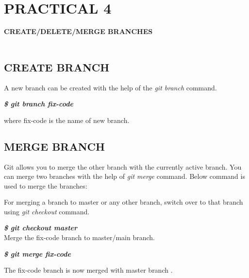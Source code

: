 \documentclass[12pt]{article}
\begin{document}
\section{PRACTICAL 4}

\textbf{\uppercase {Create/Delete/Merge Branches}} \\
\vspace{0.1\baselineskip} \\
 
\subsection{CREATE BRANCH}
A new branch can be created  with the help of the \emph{git branch} command.\\

\vspace{1 mm}

\textit{\textbf{\$ git branch fix-code}}\\

\vspace{1 mm}

where fix-code is the name of new branch.

\subsection{MERGE BRANCH}
Git allows you to merge the other branch with the currently active branch. You can merge two branches with the help of \emph{git merge} command. Below command is used to merge the branches:\\

\vspace{1 mm}

For merging a branch to master or any other branch, switch over to that branch using \emph{git checkout} command.\\
\vspace{1 mm}

\textit{\textbf{\$ git checkout master}}\\

Merge the fix-code branch to master/main branch.\\

\vspace{1 mm}

\textit{\textbf{\$ git merge fix-code}}\\

\vspace{1 mm}

The fix-code branch is now merged with master branch .
\end{document}

